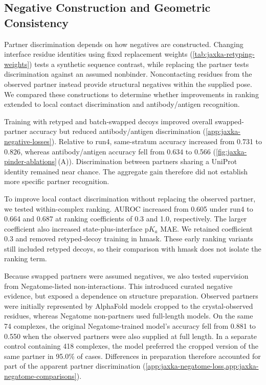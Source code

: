 \subsection{Negative Construction and Geometric Consistency}
\label{sec:jaxka-negative-geometry-results}

Partner discrimination depends on how negatives are constructed. Changing interface residue identities using fixed replacement weights (\cref{tab:jaxka-retyping-weights}) tests a synthetic sequence contrast, while replacing the partner tests discrimination against an assumed nonbinder. Noncontacting residues from the observed partner instead provide structural negatives within the supplied pose. We compared these constructions to determine whether improvements in ranking extended to local contact discrimination and antibody/antigen recognition.

Training with retyped and batch-swapped decoys improved overall swapped-partner accuracy but reduced antibody/antigen discrimination (\cref{app:jaxka-negative-losses}). Relative to run4, same-stratum accuracy increased from 0.731 to 0.826, whereas antibody/antigen accuracy fell from 0.634 to 0.566 (\cref{fig:jaxka-pinder-ablations}\,(A)). Discrimination between partners sharing a UniProt identity remained near chance. The aggregate gain therefore did not establish more specific partner recognition.

To improve local contact discrimination without replacing the observed partner, we tested within-complex ranking. AUROC increased from 0.605 under run4 to 0.664 and 0.687 at ranking coefficients of 0.3 and 1.0, respectively. The larger coefficient also increased state-plus-interface $\mathrm{p}K_a$ MAE. We retained coefficient 0.3 and removed retyped-decoy training in hmask. These early ranking variants still included retyped decoys, so their comparison with hmask does not isolate the ranking term.

Because swapped partners were assumed negatives, we also tested supervision from Negatome-listed non-interactions.\supercite{blohmNegatomeDatabaseNoninteracting2014} This introduced curated negative evidence, but exposed a dependence on structure preparation. Observed partners were initially represented by AlphaFold models cropped to the crystal-observed residues, whereas Negatome non-partners used full-length models. On the same 74 complexes, the original Negatome-trained model's accuracy fell from 0.881 to 0.550 when the observed partners were also supplied at full length. In a separate control containing 418 complexes, the model preferred the cropped version of the same partner in 95.0\% of cases. Differences in preparation therefore accounted for part of the apparent partner discrimination (\cref{app:jaxka-negatome-loss,app:jaxka-negatome-comparisons}).

